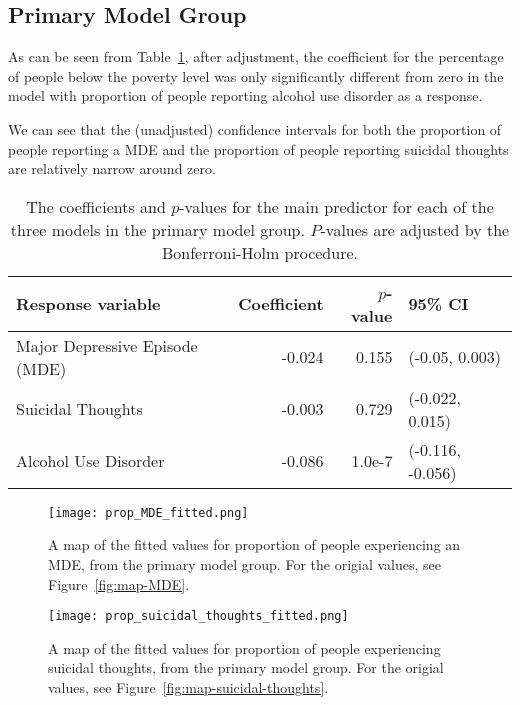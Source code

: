 \documentclass{article}
\begin{document}
\subsection{Primary Model Group}

As can be seen from Table~\ref{tab:primary-model-results},
after adjustment,
the coefficient for the percentage of people below the poverty level
was only significantly different from zero
in the model with proportion of people reporting
alcohol use disorder as a response.

We can see that the (unadjusted) confidence intervals for both
the proportion of people reporting a MDE
and the proportion of people reporting suicidal thoughts
are relatively narrow around zero.

\begin{table}[!htb]
\begin{center}
    \begin{tabular}{lrrl}
        \toprule
        Response variable & Coefficient & $p$-value & 95\% CI\\
        \midrule
        Major Depressive Episode (MDE) & -0.024 & 0.155 & (-0.05, 0.003)\\
        Suicidal Thoughts & -0.003 & 0.729 & (-0.022, 0.015)\\
        Alcohol Use Disorder & -0.086 & 1.0e-7 & (-0.116, -0.056)\\
        \bottomrule
    \end{tabular}
\caption{\label{tab:primary-model-results} The coefficients and $p$-values
    for the main predictor for each of the three models
    in the primary model group.
    $P$-values are adjusted by the Bonferroni-Holm procedure.
}
\end{center}
\end{table}

\begin{figure}[!htb]
    \centering
    \texttt{[image: prop\_MDE\_fitted.png]}
    \caption{A map of the fitted values for proportion of people experiencing an
    MDE, from the primary model group. For the origial values, see
    Figure~\ref{fig:map-MDE}.}
    \label{fig:map-fitted-MDE}
\end{figure}

\begin{figure}[!htb]
    \centering
    \texttt{[image: prop\_suicidal\_thoughts\_fitted.png]}
    \caption{A map of the fitted values for proportion of people experiencing
    suicidal thoughts, from the primary model group. For the origial values, see
    Figure~\ref{fig:map-suicidal-thoughts}.}
    \label{fig:map-fitted-suicidal-thoughts}
\end{figure}
\end{document}

